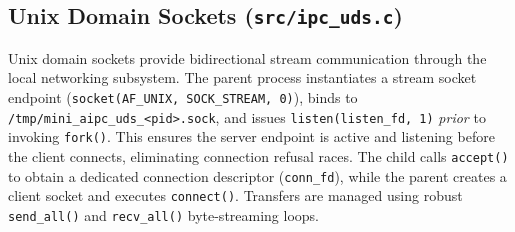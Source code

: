 \subsection{Unix Domain Sockets (\texttt{src/ipc\_uds.c})}
Unix domain sockets provide bidirectional stream communication through the local networking subsystem.
The parent process instantiates a stream socket endpoint (\texttt{socket(AF\_UNIX, SOCK\_STREAM, 0)}), binds to \texttt{/tmp/mini\_aipc\_uds\_<pid>.sock}, and issues \texttt{listen(listen\_fd, 1)} \textit{prior} to invoking \texttt{fork()}. This ensures the server endpoint is active and listening before the client connects, eliminating connection refusal races.
The child calls \texttt{accept()} to obtain a dedicated connection descriptor (\texttt{conn\_fd}), while the parent creates a client socket and executes \texttt{connect()}. Transfers are managed using robust \texttt{send\_all()} and \texttt{recv\_all()} byte-streaming loops.
